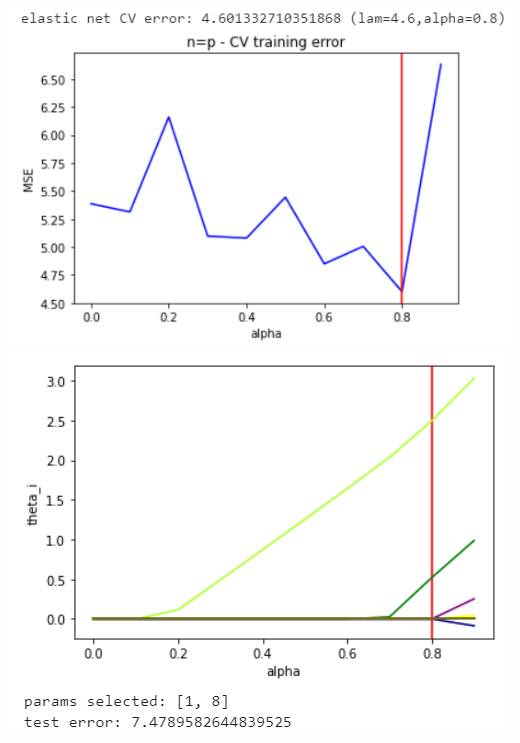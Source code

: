 \documentclass[11pt]{article}
\begin{document}
\begin{center}
\includegraphics[scale=0.7]{charts/en_ortho_n_eq_p_err.PNG}
\includegraphics[scale=0.7]{charts/en_ortho_n_eq_p_thetas.PNG}


\end{center}
\end{document}
